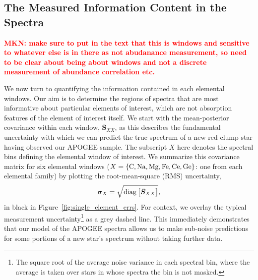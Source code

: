 \documentclass[a4paper,fleqn,usenatbib]{mnras}
\newcommand{\speccov}{{\bm S}}
\newcommand{\mkn}[1]{\textbf{\textcolor{red}{MKN: #1}}}
\begin{document}
\subsection{The Measured Information Content in the Spectra}

\mkn{make sure to put in the text that this is windows and sensitive to whatever else is in there as not abudanance measurement, so need to be clear about being about windows and not a discrete measurement of abundance correlation etc.}

We now turn to quantifying the information contained in each elemental windows. Our aim is to determine the regions of spectra that are most informative about particular elements of interest, which are not absorption features of the element of interest itself. We start with the mean-posterior covariance within each window, $\bar{\speccov}_{XX}$, as this describes the fundamental uncertainty with which we can predict the true spectrum of a new red clump star having observed our APOGEE sample. The subscript $X$ here denotes the spectral bins defining the elemental window of interest. We summarize this covariance matrix for six elemental windows ($X=\{{\rm C, Na, Mg, Fe, Ce, Ge}\}$: one from each elemental family) by plotting the root-mean-square (RMS) uncertainty,
\begin{equation}
\bm{\sigma}_X = \sqrt{{\rm diag} \left[\bar{\speccov}_{XX}\right]},
\end{equation}
in black in Figure~\ref{fig:single_element_errs}. For context, we overlay the typical measurement uncertainty\footnote{The square root of the average noise variance in each spectral bin, where the average is taken over stars in whose spectra the bin is not masked.} as a grey dashed line. This immediately demonstrates that our model of the APOGEE spectra allows us to make sub-noise predictions for some portions of a new star's spectrum without taking further data.
\end{document}
